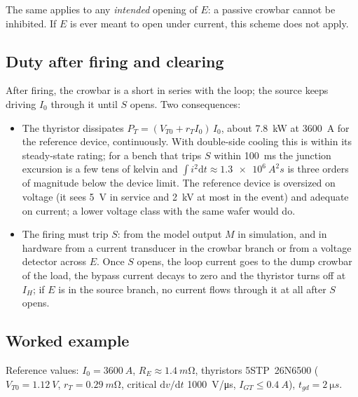 \documentclass[11pt,a4paper]{article}
\begin{document}
The same applies to any \emph{intended} opening of $E$: a passive crowbar cannot be inhibited.
If $E$ is ever meant to open under current, this scheme does not apply.

\subsection{Duty after firing and clearing}
\label{sec:duty}

After firing, the crowbar is a short in series with the loop; the source keeps driving $I_0$
through it until $S$ opens. Two consequences:

\begin{itemize}
\item The thyristor dissipates $P_T = (V_{T0} + r_T I_0)\,I_0$, about \SI{7.8}{kW} at
      \SI{3600}{A} for the reference device, continuously. With double-side cooling this is
      within its steady-state rating; for a bench that trips $S$ within \SI{100}{ms} the junction
      excursion is a few tens of kelvin and $\int i^2\mathrm{d}t \approx \SI{1.3e6}{A^2 s}$ is
      three orders of magnitude below the device limit. The reference device is oversized on
      voltage (it sees \SI{5}{V} in service and \SI{2}{kV} at most in the event) and adequate
      on current; a lower voltage class with the same wafer would do.
\item The firing must trip $S$: from the model output $M$ in simulation, and in hardware from a
      current transducer in the crowbar branch or from a voltage detector across $E$. Once $S$
      opens, the loop current goes to the dump crowbar of the load, the bypass current decays to
      zero and the thyristor turns off at $I_H$; if $E$ is in the source branch, no current
      flows through it at all after $S$ opens.
\end{itemize}

\subsection{Worked example}
\label{sec:example}

Reference values: $I_0 = \SI{3600}{A}$, $R_E \approx \SI{1.4}{m\ohm}$, thyristors
5STP~26N6500 ($V_{T0} = \SI{1.12}{V}$, $r_T = \SI{0.29}{m\ohm}$, critical
$\mathrm{d}v/\mathrm{d}t$ \SI{1000}{V/\micro s}, $I_{GT} \le \SI{0.4}{A}$), $t_{gd} = \SI{2}{\micro s}$.
\end{document}
